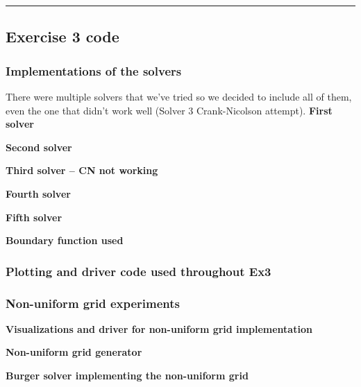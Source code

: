 \documentclass[12pt, a4paper, titlepage]{article} %
\begin{document}
\textcolor[RGB]{20,20,20}{\rule{\linewidth}{0.5pt}}
\subsection{Exercise 3 code}
%
\subsubsection{Implementations of the solvers}
There were multiple solvers that we've tried so we decided to include all of them, even the one that didn't work well (Solver 3 Crank-Nicolson attempt).
\textbf{First solver}

\textbf{Second solver}

\textbf{Third solver -- CN not working}

\textbf{Fourth solver}

\textbf{Fifth solver}

\textbf{Boundary function used}

%
\subsubsection{Plotting and driver code used throughout Ex3}

%
\subsubsection{Non-uniform grid experiments}
\textbf{Visualizations and driver for non-uniform grid implementation}

\textbf{Non-uniform grid generator}

\textbf{Burger solver implementing the non-uniform grid}

\end{document}
